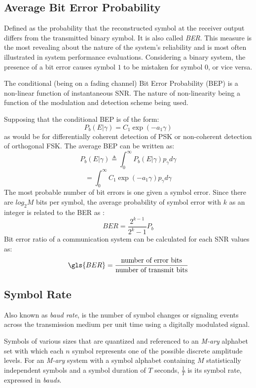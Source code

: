 \subsection{Average Bit Error Probability}
Defined as the probability that the reconstructed \gls{symbol} at the receiver output differs from the transmitted binary \gls{symbol}. It is also called \textit{\gls{BER}}. This measure is the most revealing about the nature of the system's reliability and is most often illustrated in system performance evaluations. Considering a binary system, the presence of a bit error causes \gls{symbol} $1$ to be mistaken for \gls{symbol} $0$, or
vice versa.\cite{hayk} 

The conditional (being on a fading channel) Bit Error Probability (BEP) is a non-linear function of instantaneous \gls{SNR}. The nature of non-linearity being a function of the modulation and detection scheme being used.\cite{dcommoha}

Supposing that the conditional BEP is of the form:
$$P_b\left( E|\gamma\right) = C_1 \exp \left( -a_1\gamma\right)$$
as would be for differentially coherent detection of \gls{PSK} or non-coherent detection of orthogonal \gls{FSK}. The average BEP can be written as:
$$P_b\left( E|\gamma\right) \triangleq \int_0^{\infty} P_b\left( E|\gamma\right) p_{\gamma}d\gamma$$
$$=\int_0^{\infty} C_1 \exp \left( -a_1\gamma\right) p_{\gamma}d\gamma$$
The most probable number of bit errors is one given a \gls{symbol} error. Since there are $log_2 M$ bits per
\gls{symbol}, the average probability of \gls{symbol} error with $k$ as an integer is related to the BER as :
$$BER=\frac{2^{k-1}}{2^{k}-1}P_b$$
Bit error ratio of a communication system can be calculated for each \gls{SNR} values as:
$$ \gls{BER}=\frac{\text{number  of  error  bits}}{\text{number  of  transmit  bits}}$$

\subsection{Symbol Rate}
Also known as \textit{baud rate}, is the number of symbol changes or signaling events across the transmission medium per unit time using a digitally modulated signal.

Symbols of various sizes that are quantized and referenced to an \textit{M-ary} alphabet set with which each $n$ \gls{symbol} represents one of the possible discrete amplitude levels. For an \textit{M-ary} system with a \gls{symbol} alphabet containing $M$ statistically independent \gls{symbol}s and a \gls{symbol} duration of $T$ seconds, $\frac{1}{T}$ is its \gls{symbol} rate, expressed in \textit{bauds}\cite{hayk}.

